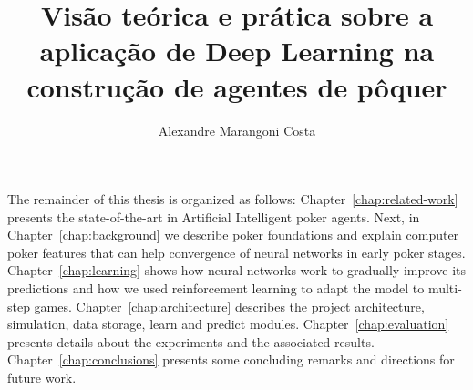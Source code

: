 \documentclass[master,american]{ThesisPUC}
\author{Alexandre Marangoni Costa}
\title{Visão teórica e prática sobre a aplicação de Deep Learning na construção de agentes de pôquer}
\begin{document}







The remainder of this thesis is organized as follows: Chapter~\ref{chap:related-work} presents the state-of-the-art in Artificial Intelligent poker agents. Next, in Chapter~\ref{chap:background} we describe poker foundations and explain computer poker features that can help convergence of neural networks in early poker stages. Chapter~\ref{chap:learning} shows how neural networks work to gradually improve its predictions and how we used reinforcement learning to adapt the model to multi-step games. Chapter~\ref{chap:architecture} describes the project architecture, simulation, data storage, learn and predict modules. Chapter~\ref{chap:evaluation} presents details about the experiments and the associated results. Chapter~\ref{chap:conclusions} presents some concluding remarks and directions for future work.

\arial


%
\end{document}
